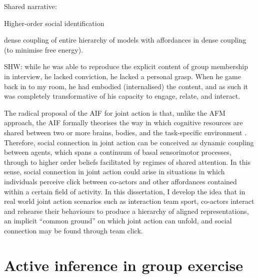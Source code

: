 \begin{CJK}{UTF8}{gbsn}


Shared narrative:


Higher-order social identification

dense coupling of entire hierarchy of models with affordances in dense coupling (to minimise free energy).

SHW: while he was able to reproduce the explicit content of group membership in interview, he lacked conviction, he lacked a personal grasp.  When he game back in to my room, he had embodied (internalised)
the content, and as such it was completely transformative of his capacity to engage, relate, and interact.





The radical proposal of the AIF for joint action is that, unlike the AFM approach, the AIF formally theorises the way in which cognitive resources are shared between two or more brains, bodies, and the task-specific environment \citep{Clark2015}.  Therefore, social connection in joint action can be conceived as dynamic coupling between agents, which spans a continuum of basal sensorimotor processes, through to higher order beliefs facilitated by regimes of shared attention.  In this sense, social connection in joint action could arise in situations in which individuals perceive click between co-actors and other affordances contained within a certain field of activity.  In this dissertation, I develop the idea that in real world joint action scenarios such as interaction team sport, co-actors interact and rehearse their behaviours to produce a hierarchy of aligned representations, an implicit ``common ground'' \citep[cf.][]{Noy2017} on which joint action can unfold, and social connection may be found through team click.

























\section{Active inference in group exercise \label{sect:activeInfGE}}


\end{CJK}
